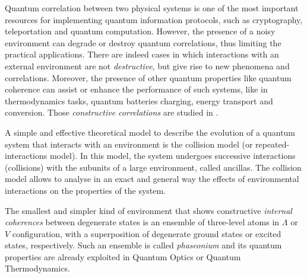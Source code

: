 \documentclass[]{article}
\begin{document}

Quantum correlation between two physical systems is one of the most important resources for implementing quantum information protocols, such as cryptography, teleportation and quantum computation. 
However, the presence of a noisy environment can degrade or destroy quantum correlations, thus limiting the practical applications. 
There are indeed cases in which interactions with an external environment are not \emph{destructive}, but give rise to new phenomena and correlations.
Moreover, the presence of other quantum properties like quantum coherence can assist or enhance the performance of such systems, like in thermodynamics tasks, quantum batteries charging, energy transport and conversion.
Those \emph{constructive correlations} are studied in \cite{latune_apparent_2019}.

A simple and effective theoretical model to describe the evolution of a quantum system that interacts with an environment is the collision model (or repeated-interactions model). 
In this model, the system undergoes successive interactions (collisions) with the subunits of a large environment, called ancillas. 
The collision model allows to analyse in an exact and general way the effects of environmental interactions on the properties of the system.

The smallest and simpler kind of environment that shows constructive \emph{internal coherences} between degenerate states is an ensemble of three-level atoms in $\Lambda$ or $V$ configuration, with a superposition of degenerate ground states or excited states, respectively.
Such an ensemble is called \emph{phaseonium} and its quantum properties are already exploited in Quantum Optics or Quantum Thermodynamics.
\end{document}
